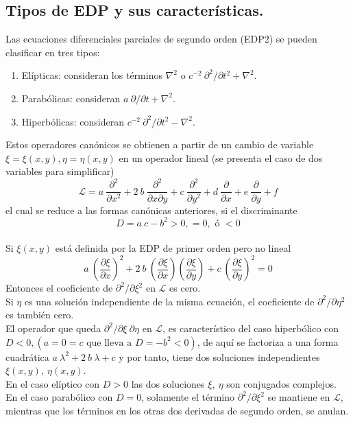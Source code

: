 \subsection{Tipos de EDP y sus características.}
Las ecuaciones diferenciales parciales de segundo orden (EDP2) se pueden clasificar en tres tipos:
\begin{enumerate}
\item Elípticas: consideran los términos $\nabla^{2}$ o $c^{-2} \: \partial^{2} / \partial t^{2} + \nabla^{2}$.
\item Parabólicas: consideran $a \: \partial / \partial t + \nabla^{2}$.
\item Hiperbólicas: consideran $c^{-2} \: \partial^{2} / \partial t^{2} - \nabla^{2}$.
\end{enumerate}
Estos operadores canónicos se obtienen a partir de un cambio de variable $\xi = \xi(x,y), \eta = \eta (x,y)$ en un operador lineal (se presenta el caso de dos variables para simplificar)
\begin{equation}
\mathcal{L} = a \: \dfrac{\partial^{2}}{\partial x^{2}} + 2 \: b \: \dfrac{\partial^{2}}{\partial x \partial y} + c \: \dfrac{\partial^{2}}{\partial y^{2}} + d \: \dfrac{\partial}{\partial x} +  e \: \dfrac{\partial}{\partial y} +  f
\end{equation}
el cual se reduce a las formas canónicas anteriores, si el discriminante \[ D = a \: c - b^{2} > 0, = 0, \mbox{ ó } < 0 \]
\\
Si $\xi(x, y)$ está definida por la EDP de primer orden pero no lineal
\begin{equation}
a \: \left(\dfrac{\partial \xi}{\partial x} \right)^{2} + 2 \: b \: \left(\dfrac{\partial \xi}{\partial x} \right) \left(\dfrac{\partial \xi}{\partial y} \right) + c \: \left(\dfrac{\partial \xi}{\partial y} \right)^{2} = 0
\end{equation}
Entonces el coeficiente de $\partial^{2} / \partial \xi^{2}$ en $\mathcal{L}$ es cero.
\\
Si $\eta$ es una solución independiente de la misma ecuación, el coeficiente de $\partial^{2} / \partial \eta^{2}$ es también cero.
\\
El operador que queda $\partial^{2} / \partial \xi \: \partial \eta$ en $\mathcal{L}$, es característico del caso hiperbólico con $D<0,(a=0=c \mbox{ que lleva a } D = - b^{2} < 0)$, de aquí se factoriza a una forma cuadrática $a \: \lambda^{2} + 2\: b \: \lambda + c$ y por tanto, tiene dos soluciones independientes $\xi(x, y), \: \eta(x, y)$.
\\
En el caso elíptico con $D > 0$ las dos soluciones $\xi, \: \eta$ son conjugados complejos.
\\
En el caso parabólico con $D=0$, solamente el término $\partial^{2} / \partial \xi^{2}$ se mantiene en $\mathcal{L}$, mientras que los términos en los otras dos derivadas de segundo orden, se anulan.

